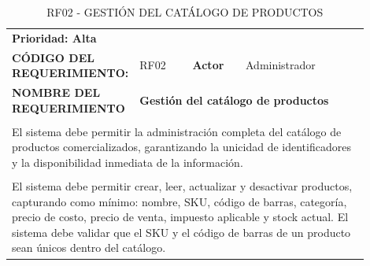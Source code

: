 \begingroup
\renewcommand{\arraystretch}{1.3}
\setlength{\tabcolsep}{6pt}
\centering
\begin{longtable}{|p{0.25\linewidth}|p{0.15\linewidth}|p{0.15\linewidth}|p{0.35\linewidth}|}
\caption{RF02 - GESTIÓN DEL CATÁLOGO DE PRODUCTOS}\label{tab:rf02}\\
\hline
		\rowcolor{tableheaderblue}
		\multicolumn{4}{|l|}{\textbf{Requerimientos funcionales}}                                                                                                                                    \\ \hline
		\multicolumn{4}{|l|}{\textbf{Prioridad: Alta}}                                                                                                                                               \\ \hline
		\textbf{CÓDIGO DEL REQUERIMIENTO:}                          & RF02                                                            & \cellcolor{tableheaderblue}\textbf{Actor} & Administrador    \\ \hline
		\textbf{NOMBRE DEL REQUERIMIENTO}                           & \multicolumn{3}{l|}{\textbf{Gestión del catálogo de productos}}                                                                \\ \hline
		\rowcolor{tableheaderblue}
		\multicolumn{4}{|l|}{\textbf{Descripción}}                                                                                                                                                   \\ \hline
		\multicolumn{4}{|p{0.96\linewidth}|}{%
		El sistema debe permitir la administración completa del catálogo de productos comercializados, garantizando la unicidad de identificadores y la disponibilidad inmediata de la información.} \\ \hline
		\rowcolor{tableheaderblue}
		\multicolumn{4}{|l|}{\textbf{Funcionalidad}}                                                                                                                                                 \\ \hline
		\multicolumn{4}{|p{0.96\linewidth}|}{%
		El sistema debe permitir crear, leer, actualizar y desactivar productos, capturando como mínimo: nombre, SKU, código de barras, categoría, precio de costo, precio de venta, impuesto aplicable y stock actual. \newline
		El sistema debe validar que el SKU y el código de barras de un producto sean únicos dentro del catálogo. \newline
}
\end{longtable}
